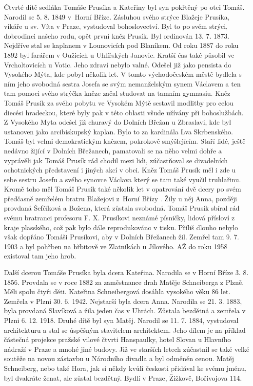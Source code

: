 \documentclass[../dejiny-rodu-prusiku.tex]{subfiles}
\begin{document}
Čtvrté dítě sedláka Tomáše Prusíka a Kateřiny byl syn pokřtěný po otci Tomáš. Narodil se 5. 8. 1849 v Horní Bříze. Zásluhou svého strýce Blažeje Prusíka, vikáře u sv. Víta v Praze, vystudoval bohoslovectví. Byl to po svém strýci, dobrodinci našeho rodu, opět první kněz Prusík. Byl ordinován 13. 7. 1873. Nejdříve stal se kaplanem v Lounovicích pod Blaníkem. Od roku 1887 do roku 1892 byl farářem v Oužicích u Uhlířských Janovic. Kratší čas také působil ve Vrcholtovicích u Votic. Jeho zdraví nebylo valné. Odešel již jako pensista do Vysokého Mýta, kde pobyl několik let. V tomto východočeském městě bydlela s ním jeho svobodná sestra Josefa se svým nemanželským synem Václavem a ten tam pomoci svého strýčka kněze začal studovat na tamním gymnasiu. Kněz Tomáš Prusík za svého pobytu ve Vysokém Mýtě sestavil modlitby pro celou diecési hradeckou, které byly pak v této oblasti všude užívány při bohoslužbách. Z Vysokého Myta odešel již churavý do Dolních Břežan u Zbraslavi, kde byl ustanoven jako arcibiskupský kaplan. Bylo to za kardinála Lva Skrbenského. Tomáš byl velmi demokratickým knězem, pokrokově smýšlejícím. Staří lidé, ještě nedávno žijící
v Dolních Břežanech, pamatovali se na něho velmi dohře a vyprávěli jak Tomáš Prusík rád chodil mezi lidi, zúčastňoval se divadelních ochotnických před­stavení i jiných akcí v obci. Kněz Tomáš Prusík měl i zde u sebe sestru Josefu a svého synovce Václava který se tam také vyučil truhlařinu. Kromě toho měl Tomáš Prusík také několik let v opatrování dvě dcery po svém předčasně zemřelém bratru Blažejovi z Horní Břízy . Žily u něj Anna, později provdaná Šefčíková a Božena, která zůstala svobodná. Tomáš Prusík sbíral rád svému bratranci profesoru F. X. Prusíkovi neznámé písničky, lidová přísloví z kraje plasského, což pak bylo dále reprodukováno v tisku. Příliš dlouho nebylo však dopřáno Tomáši Prusíkovi, aby v Dolních Břežanech žil. Zemřel tam 9. 7. 1903 a byl pohřben na hřbitově ve Zlatníkách u Jílového. AŽ do roku 1958 existoval tam jeho hrob.

Další dcerou Tomáše Prusíka byla dcera Kateřina. Narodila se v Horní Bříze 3. 8. 1856. Provdala se v roce 1882 za zaměstnance drah Matěje Schneiberga z Plzně. Měli spolu čtyři děti. Kateřina Schneibergová dosáhla vysokého věku 86 let. Zemřela v Plzni 30. 6. 1942. Nejstarší byla dcera Anna. Narodila se 21. 3. 1883, byla provdaná Slavíková a žila jeden čas v Uhrách. Zůstala bezdětná a zemřela v Plzni 6. 12. 1918. Druhé dítě byl syn Matěj. Narodil se 11. 7. 1884, vystudoval architekturu a stal se úspěšným stavitelem-architektem. Jeho dílem je na příklad částečná projekce pražské vilové čtvrti Hanspaulky, hotel Slovan u Hlavního nádraží v Praze a mnohé jiné budovy. Již ve starších letech zúčastnil se také velké soutěže na novou zástavbu u Národního divadla a byl odměněn cenou. Matěj Schneiberg, nebo také Hora, jak si někdy kvůli českosti přidával ke svému jménu, byl dvakráte ženat, ale zůstal bezdětný. Bydlí v Praze, Žižkově, Bořivojova 114.
\end{document}
